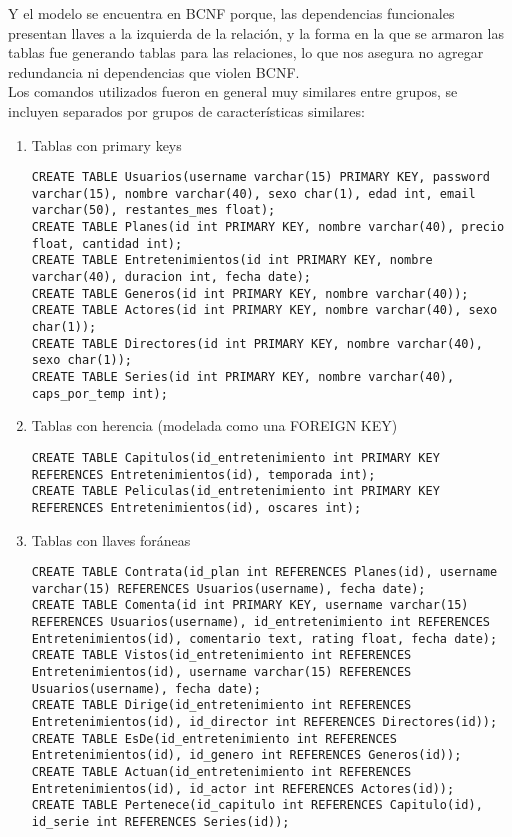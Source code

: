 \documentclass[letter]{article}
\begin{document}
\begin{pregunta}{1}
		Y el modelo se encuentra en BCNF porque, las dependencias funcionales presentan llaves a la izquierda de la relación, y la forma en la que se armaron las tablas fue generando tablas para las relaciones, lo que nos asegura no agregar redundancia ni dependencias que violen BCNF.\\

		Los comandos utilizados fueron en general muy similares entre grupos, se incluyen separados por grupos de características similares:\\
		\begin{enumerate}
			\item Tablas con primary keys
				\begin{lstlisting}
CREATE TABLE Usuarios(username varchar(15) PRIMARY KEY, password varchar(15), nombre varchar(40), sexo char(1), edad int, email varchar(50), restantes_mes float);
CREATE TABLE Planes(id int PRIMARY KEY, nombre varchar(40), precio float, cantidad int);
CREATE TABLE Entretenimientos(id int PRIMARY KEY, nombre varchar(40), duracion int, fecha date);
CREATE TABLE Generos(id int PRIMARY KEY, nombre varchar(40));
CREATE TABLE Actores(id int PRIMARY KEY, nombre varchar(40), sexo char(1));
CREATE TABLE Directores(id int PRIMARY KEY, nombre varchar(40), sexo char(1));
CREATE TABLE Series(id int PRIMARY KEY, nombre varchar(40), caps_por_temp int);
				\end{lstlisting}
			\item Tablas con herencia (modelada como una FOREIGN KEY)
				\begin{lstlisting}
CREATE TABLE Capitulos(id_entretenimiento int PRIMARY KEY REFERENCES Entretenimientos(id), temporada int);
CREATE TABLE Peliculas(id_entretenimiento int PRIMARY KEY REFERENCES Entretenimientos(id), oscares int);
				\end{lstlisting}
			\item Tablas con llaves foráneas
				\begin{lstlisting}
CREATE TABLE Contrata(id_plan int REFERENCES Planes(id), username varchar(15) REFERENCES Usuarios(username), fecha date);
CREATE TABLE Comenta(id int PRIMARY KEY, username varchar(15) REFERENCES Usuarios(username), id_entretenimiento int REFERENCES Entretenimientos(id), comentario text, rating float, fecha date);
CREATE TABLE Vistos(id_entretenimiento int REFERENCES Entretenimientos(id), username varchar(15) REFERENCES Usuarios(username), fecha date);
CREATE TABLE Dirige(id_entretenimiento int REFERENCES Entretenimientos(id), id_director int REFERENCES Directores(id));
CREATE TABLE EsDe(id_entretenimiento int REFERENCES Entretenimientos(id), id_genero int REFERENCES Generos(id));
CREATE TABLE Actuan(id_entretenimiento int REFERENCES Entretenimientos(id), id_actor int REFERENCES Actores(id));
CREATE TABLE Pertenece(id_capitulo int REFERENCES Capitulo(id), id_serie int REFERENCES Series(id));
				\end{lstlisting}
		\end{enumerate}


\end{pregunta}
\end{document}
